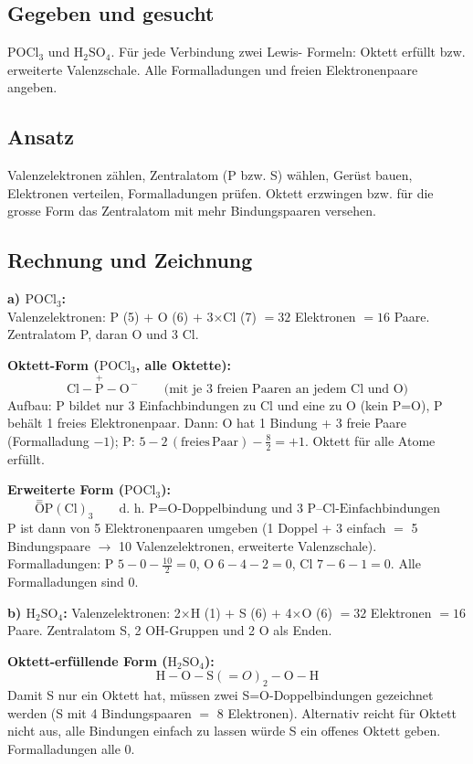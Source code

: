 
\subsection*{Gegeben und gesucht}
$\mathrm{POCl_3}$ und $\mathrm{H_2SO_4}$. F\"ur jede Verbindung zwei Lewis-
Formeln: Oktett erfüllt bzw. erweiterte Valenzschale. Alle Formalladungen
und freien Elektronenpaare angeben.

\subsection*{Ansatz}
Valenzelektronen z\"ahlen, Zentralatom (P bzw. S) w\"ahlen, Gerüst bauen,
Elektronen verteilen, Formalladungen pr\"ufen. Oktett erzwingen bzw. f\"ur
die grosse Form das Zentralatom mit mehr Bindungspaaren versehen.

\subsection*{Rechnung und Zeichnung}
\textbf{a) $\mathrm{POCl_3}$:}\\
Valenzelektronen: P (5) $+$ O (6) $+$ 3$\times$Cl (7) $= 32$ Elektronen
$= 16$ Paare. Zentralatom P, daran O und 3 Cl.

\textbf{Oktett-Form ($\mathrm{POCl_3}$, alle Oktette):}
\nopagebreak
\[
  \mathrm{Cl - \overset{+}{\mathrm{P}} - O^{\,-}}
  \qquad\text{(mit je 3 freien Paaren an jedem Cl und O)}
\]
Aufbau: P bildet nur 3 Einfachbindungen zu Cl und eine zu O (kein P=O),
P beh\"alt 1 freies Elektronenpaar. Dann: O hat 1 Bindung + 3 freie Paare
(Formalladung $-1$); P: $5 - 2\,(\mathrm{freies\,Paar}) - \tfrac{8}{2} = +1$.
Oktett f\"ur alle Atome erf\"ullt.

\textbf{Erweiterte Form ($\mathrm{POCl_3}$):}
\[
  \overset{=}{\mathrm{O}}\mathrm{P(Cl)}_3
  \qquad\text{d.~h.\ P=O-Doppelbindung und 3 P--Cl-Einfachbindungen}
\]
P ist dann von 5 Elektronenpaaren umgeben (1 Doppel + 3 einfach $=$ 5
Bindungspaare $\rightarrow$ 10 Valenzelektronen, erweiterte Valenzschale).
Formalladungen: P $5-0-\tfrac{10}{2}=0$, O $6-4-2=0$, Cl $7-6-1=0$.
Alle Formalladungen sind 0.

\textbf{b) $\mathrm{H_2SO_4}$:}
Valenzelektronen: 2$\times$H (1) $+$ S (6) $+$ 4$\times$O (6) $= 32$
Elektronen $= 16$ Paare. Zentralatom S, 2 OH-Gruppen und 2 O als Enden.

\textbf{Oktett-erfüllende Form ($\mathrm{H_2SO_4}$):}
\[
  \mathrm{H}{-}\mathrm{O}{-}\mathrm{S}(=O)_2{-}\mathrm{O}{-}\mathrm{H}
\]
Damit S nur ein Oktett hat, m\"ussen zwei S=O-Doppelbindungen gezeichnet
werden (S mit 4 Bindungspaaren $=$ 8 Elektronen). Alternativ reicht f\"ur
Oktett nicht aus, alle Bindungen einfach zu lassen w\"urde S ein offenes
Oktett geben. Formalladungen alle 0.

